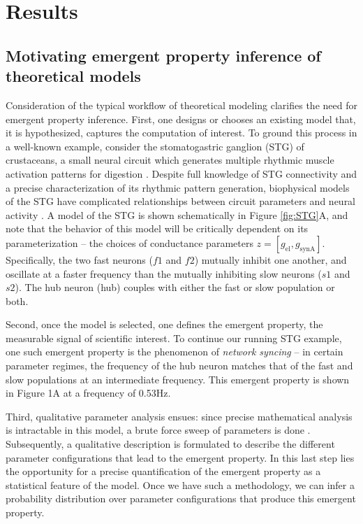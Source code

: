 \documentclass[11pt]{article}
\begin{document}

\section{Results}
\subsection{Motivating emergent property inference of theoretical models} \label{results_motivating}

Consideration of the typical workflow of theoretical modeling clarifies the need for emergent property inference.  
First, one designs or chooses an existing model that, it is hypothesized, captures the computation of interest. 
 To ground this process in a well-known example, consider the stomatogastric ganglion (STG) of crustaceans, a small neural circuit which generates multiple rhythmic muscle activation patterns for digestion \cite{marder2002cellular}.
Despite full knowledge of STG connectivity and a precise characterization of its rhythmic pattern generation, biophysical models of the STG have complicated relationships between circuit parameters and neural activity \cite{goldman2001global, prinz2004similar}.
A model of the STG \cite{gutierrez2013multiple} is shown schematically in Figure \ref{fig:STG}A, and note that the behavior of this model will be critically dependent on its parameterization -- the choices of conductance parameters $z = [g_{\text{el}}, g_{\text{synA}}]$.
Specifically, the two fast neurons ($f1$ and $f2$) mutually inhibit one another, and oscillate at a faster frequency than the mutually inhibiting slow neurons ($s1$ and $s2$).  The hub neuron (hub) couples with either the fast or slow population or both.  

Second, once the model is selected, one defines the emergent property, the measurable signal of scientific interest.  
To continue our running STG example, one such emergent property is the phenomenon of \emph{network syncing} -- in certain parameter regimes, the frequency of the hub neuron matches that of the fast and slow populations at an intermediate frequency.  This emergent property is shown in Figure 1A at a frequency of 0.53Hz.

Third, qualitative parameter analysis ensues: since precise mathematical analysis is intractable in this model, a brute force sweep of parameters is done \cite{gutierrez2013multiple}.  Subsequently, a qualitative description is formulated to describe the different parameter configurations that lead to the emergent property.  
In this last step lies the opportunity for a precise quantification of the emergent property as a statistical feature of the model.  Once we have such a methodology, we can infer a probability distribution over parameter configurations that produce this emergent property. 
\end{document}
